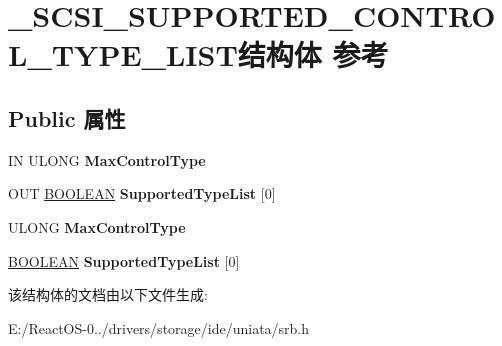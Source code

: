 \hypertarget{struct___s_c_s_i___s_u_p_p_o_r_t_e_d___c_o_n_t_r_o_l___t_y_p_e___l_i_s_t}{}\section{\+\_\+\+S\+C\+S\+I\+\_\+\+S\+U\+P\+P\+O\+R\+T\+E\+D\+\_\+\+C\+O\+N\+T\+R\+O\+L\+\_\+\+T\+Y\+P\+E\+\_\+\+L\+I\+S\+T结构体 参考}
\label{struct___s_c_s_i___s_u_p_p_o_r_t_e_d___c_o_n_t_r_o_l___t_y_p_e___l_i_s_t}
\subsection*{Public 属性}
\begin{DoxyCompactItemize}
\item 
\mbox{\label{struct___s_c_s_i___s_u_p_p_o_r_t_e_d___c_o_n_t_r_o_l___t_y_p_e___l_i_s_t_abe0759ae312c29b2580aff45c173d283}} 
IN U\+L\+O\+NG {\bfseries Max\+Control\+Type}
\item 
\mbox{\label{struct___s_c_s_i___s_u_p_p_o_r_t_e_d___c_o_n_t_r_o_l___t_y_p_e___l_i_s_t_a973b90bce39991a42e01520753d9eb25}} 
O\+UT \hyperlink{_processor_bind_8h_a112e3146cb38b6ee95e64d85842e380a}{B\+O\+O\+L\+E\+AN} {\bfseries Supported\+Type\+List} \mbox{[}0\mbox{]}
\item 
\mbox{\label{struct___s_c_s_i___s_u_p_p_o_r_t_e_d___c_o_n_t_r_o_l___t_y_p_e___l_i_s_t_acfe864008ec17d68ab97f26457718315}} 
U\+L\+O\+NG {\bfseries Max\+Control\+Type}
\item 
\mbox{\label{struct___s_c_s_i___s_u_p_p_o_r_t_e_d___c_o_n_t_r_o_l___t_y_p_e___l_i_s_t_afde7127bc854cc241d23e7ae1617658f}} 
\hyperlink{_processor_bind_8h_a112e3146cb38b6ee95e64d85842e380a}{B\+O\+O\+L\+E\+AN} {\bfseries Supported\+Type\+List} \mbox{[}0\mbox{]}
\end{DoxyCompactItemize}


该结构体的文档由以下文件生成\+:\begin{DoxyCompactItemize}
\item 
E\+:/\+React\+O\+S-\/0../drivers/storage/ide/uniata/srb.\+h\end{DoxyCompactItemize}
